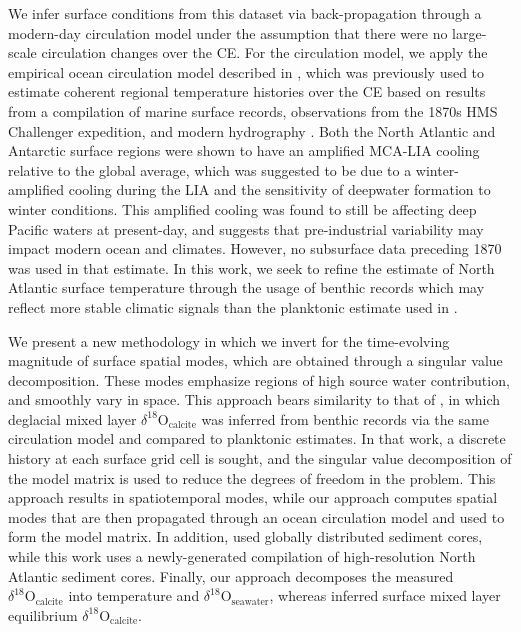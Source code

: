 \documentclass[draft]{agujournal2019}
\begin{document}
We infer surface conditions from this dataset via back-propagation through a modern-day circulation model under the assumption that there were no large-scale circulation changes over the CE. For the circulation model, we apply the empirical ocean circulation model described in , which was previously used to estimate coherent regional temperature histories over the CE based on results from a compilation of marine surface records, observations from the 1870s HMS Challenger expedition, and modern hydrography \cite{gebbie19}. Both the North Atlantic and Antarctic surface regions were shown to have an amplified MCA-LIA cooling relative to the global average, which was suggested to be due to a winter-amplified cooling during the LIA and the sensitivity of deepwater formation to winter conditions. This amplified cooling was found to still be affecting deep Pacific waters at present-day, and suggests that pre-industrial variability may impact modern ocean and climates. However, no subsurface data preceding 1870 was used in that estimate. In this work, we seek to refine the estimate of North Atlantic surface temperature through the usage of benthic records which may reflect more stable climatic signals than the planktonic estimate used in . 

We present a new methodology in which we invert for the time-evolving magnitude of surface spatial modes, which are obtained through a singular value decomposition. These modes emphasize regions of high source water contribution, and smoothly vary in space. This approach bears similarity to that of , in which deglacial mixed layer $\delta^{18}\mathrm{O}_{\mathrm{calcite}}$ was inferred from benthic records via the same circulation model and compared to planktonic estimates. In that work, a discrete history at each surface grid cell is sought, and the singular value decomposition of the model matrix is used to reduce the degrees of freedom in the problem. This approach results in spatiotemporal modes, while our approach computes spatial modes that are then propagated through an ocean circulation model and used to form the model matrix. In addition,  used globally distributed sediment cores, while this work uses a newly-generated compilation of high-resolution North Atlantic sediment cores. Finally, our approach decomposes the measured $\delta^{18}\mathrm{O}_{\mathrm{calcite}}$ into temperature and $\delta^{18}\mathrm{O}_{\mathrm{seawater}}$, whereas  inferred surface mixed layer equilibrium $\delta^{18}\mathrm{O}_{\mathrm{calcite}}$. 
\end{document}
